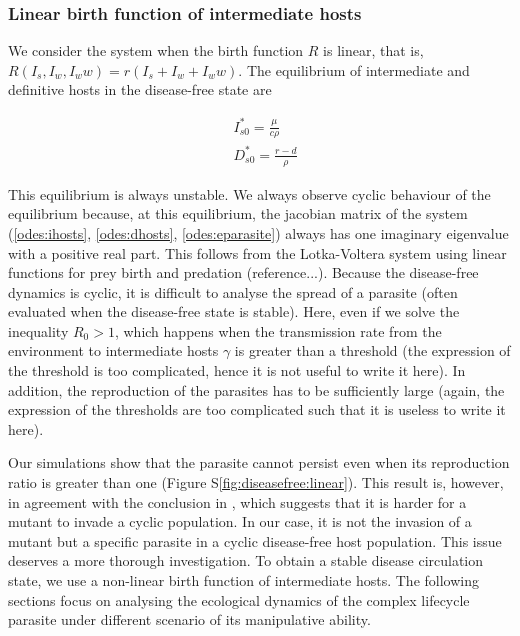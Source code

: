 \documentclass{article}
\begin{document}
\subsubsection{Linear birth function of intermediate hosts}
We consider the system when the birth function $R$ is linear, that is, $R(I_s, I_w, I_ww) = r(I_s + I_w + I_ww)$. The equilibrium of intermediate and definitive hosts in the disease-free state are

\begin{align*}
& I_{s0}^* = \frac{\mu}{c \rho} \\
& D_{s0}^* = \frac{r - d}{\rho}
\end{align*}

This equilibrium is always unstable. 
We always observe cyclic behaviour of the equilibrium because, at this equilibrium, the jacobian matrix of the system (\ref{odes:ihosts}, \ref{odes:dhosts}, \ref{odes:eparasite}) always has one imaginary eigenvalue with a positive real part. 
This follows from the Lotka-Voltera system using linear functions for prey birth and predation (reference...). 
Because the disease-free dynamics is cyclic, it is difficult to analyse the spread of a parasite (often evaluated when the disease-free state is stable). 
Here, even if we solve the inequality $R_0 > 1$, which happens when the transmission rate from the environment to intermediate hosts $\gamma$ is greater than a threshold (the expression of the threshold is too complicated, hence it is not useful to write it here). 
In addition, the reproduction of the parasites has to be sufficiently large (again, the expression of the thresholds are too complicated such that it is useless to write it here).

Our simulations show that the parasite cannot persist even when its reproduction ratio is greater than one (Figure S\ref{fig:diseasefree:linear}). This result is, however, in agreement with the conclusion in \citet{Ripa:Evol:2013}, which suggests that it is harder for a mutant to invade a cyclic population. 
In our case, it is not the invasion of a mutant but a specific parasite in a cyclic disease-free host population. 
This issue deserves a more thorough investigation. 
To obtain a stable disease circulation state, we use a non-linear birth function of intermediate hosts. The following sections focus on analysing the ecological dynamics of the complex lifecycle parasite under different scenario of its manipulative ability.
\end{document}
